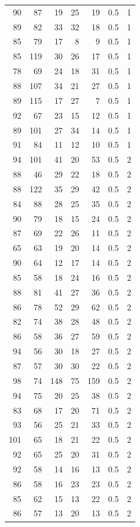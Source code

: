 \documentclass[
  11pt,
  a4paper,
]{scrartcl}
\begin{document}
\begin{longtable}[]{@{}rrrrrrl@{}}
90 & 87 & 19 & 25 & 19 & 0.5 & 1 \\
89 & 82 & 33 & 32 & 18 & 0.5 & 1 \\
85 & 79 & 17 & 8 & 9 & 0.5 & 1 \\
85 & 119 & 30 & 26 & 17 & 0.5 & 1 \\
78 & 69 & 24 & 18 & 31 & 0.5 & 1 \\
88 & 107 & 34 & 21 & 27 & 0.5 & 1 \\
89 & 115 & 17 & 27 & 7 & 0.5 & 1 \\
92 & 67 & 23 & 15 & 12 & 0.5 & 1 \\
89 & 101 & 27 & 34 & 14 & 0.5 & 1 \\
91 & 84 & 11 & 12 & 10 & 0.5 & 1 \\
94 & 101 & 41 & 20 & 53 & 0.5 & 2 \\
88 & 46 & 29 & 22 & 18 & 0.5 & 2 \\
88 & 122 & 35 & 29 & 42 & 0.5 & 2 \\
84 & 88 & 28 & 25 & 35 & 0.5 & 2 \\
90 & 79 & 18 & 15 & 24 & 0.5 & 2 \\
87 & 69 & 22 & 26 & 11 & 0.5 & 2 \\
65 & 63 & 19 & 20 & 14 & 0.5 & 2 \\
90 & 64 & 12 & 17 & 14 & 0.5 & 2 \\
85 & 58 & 18 & 24 & 16 & 0.5 & 2 \\
88 & 81 & 41 & 27 & 36 & 0.5 & 2 \\
86 & 78 & 52 & 29 & 62 & 0.5 & 2 \\
82 & 74 & 38 & 28 & 48 & 0.5 & 2 \\
86 & 58 & 36 & 27 & 59 & 0.5 & 2 \\
94 & 56 & 30 & 18 & 27 & 0.5 & 2 \\
87 & 57 & 30 & 30 & 22 & 0.5 & 2 \\
98 & 74 & 148 & 75 & 159 & 0.5 & 2 \\
94 & 75 & 20 & 25 & 38 & 0.5 & 2 \\
83 & 68 & 17 & 20 & 71 & 0.5 & 2 \\
93 & 56 & 25 & 21 & 33 & 0.5 & 2 \\
101 & 65 & 18 & 21 & 22 & 0.5 & 2 \\
92 & 65 & 25 & 20 & 31 & 0.5 & 2 \\
92 & 58 & 14 & 16 & 13 & 0.5 & 2 \\
86 & 58 & 16 & 23 & 23 & 0.5 & 2 \\
85 & 62 & 15 & 13 & 22 & 0.5 & 2 \\
86 & 57 & 13 & 20 & 13 & 0.5 & 2 \\

\end{longtable}
\end{document}
